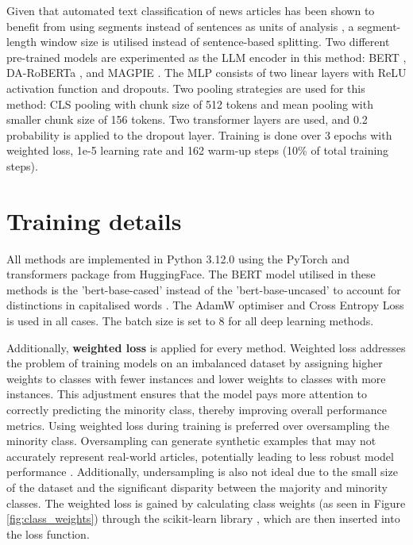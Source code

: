 Given that automated text classification of news articles has been shown to benefit from using segments instead of sentences as units of analysis \cite{barbera-2021-article-classification}, a segment-length window size is utilised instead of sentence-based splitting. Two different pre-trained models are experimented as the LLM encoder in this method: BERT \cite{devlin-2019-bert}, DA-RoBERTa \cite{krieger-2022-domain}, and MAGPIE \cite{horych-2024-magpie}. The MLP consists of two linear layers with ReLU activation function \cite{agarap-2018-relu} and dropouts. Two pooling strategies are used for this method: CLS pooling with chunk size of 512 tokens and mean pooling with smaller chunk size of 156 tokens. Two transformer layers are used, and 0.2 probability is applied to the dropout layer. Training is done over 3 epochs with weighted loss, 1e-5 learning rate and 162 warm-up steps (10\% of total training steps). 


\section{Training details}

All methods are implemented in Python 3.12.0 \cite{van-1995-python} using the PyTorch \cite{paszke-2017-pytorch} and transformers \cite{wolf-2020-huggingface} package from HuggingFace. The BERT model utilised in these methods is the 'bert-base-cased' instead of the 'bert-base-uncased' to account for distinctions in capitalised words \cite{devlin-2019-bert}. The AdamW \cite{loshchilov-2019-adamw} optimiser and Cross Entropy Loss is used in all cases. The batch size is set to 8 for all deep learning methods.

Additionally, \textbf{weighted loss} is applied for every method. Weighted loss addresses the problem of training models on an imbalanced dataset by assigning higher weights to classes with fewer instances and lower weights to classes with more instances. This adjustment ensures that the model pays more attention to correctly predicting the minority class, thereby improving overall performance metrics. Using weighted loss during training is preferred over oversampling the minority class. Oversampling can generate synthetic examples that may not accurately represent real-world articles, potentially leading to less robust model performance \cite{alkhawaldeh-2023-challenges}. Additionally, undersampling is also not ideal due to the small size of the dataset and the significant disparity between the majority and minority classes. The weighted loss is gained by calculating class weights (as seen in Figure \ref{fig:class_weights}) through the scikit-learn library \cite{pedregosa-2011-scikit-learn}, which are then inserted into the loss function.

